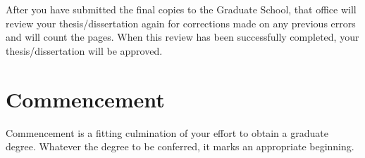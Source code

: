 After you have submitted the final copies to the Graduate School, that
office will review your the\-sis/dis\-ser\-ta\-tion again for
corrections made on any previous errors and will count the pages. When
this review has been successfully completed, your
the\-sis/dis\-ser\-ta\-tion will be approved.

\section{Commencement}
\label{sec:Commencement}

Commencement is a fitting culmination of your effort to obtain a
graduate degree. Whatever the degree to be conferred, it marks an
appropriate beginning.

